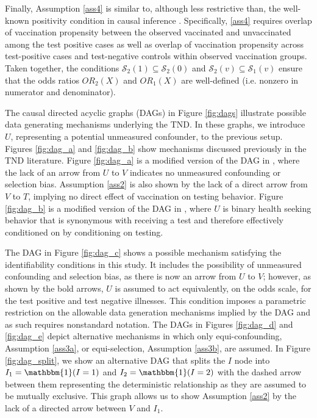 \documentclass[11pt]{article}
\begin{document}
Finally, Assumption \ref{ass4} is similar to, although less restrictive than, the well-known positivity condition in causal inference \cite{hernan_causal_2020}. Specifically, \ref{ass4} requires overlap of vaccination propensity between the observed vaccinated and unvaccinated among the test positive cases as well as overlap of vaccination propensity across test-positive cases and test-negative controls within observed vaccination groups. Taken together, the conditions $\mathcal{S}_2(1) \subseteq \mathcal{S}_2(0)$ and $\mathcal{S}_2(v) \subseteq \mathcal{S}_1(v)$ ensure that the odds ratios $OR_2(X)$ and $OR_1(X)$ are well-defined (i.e. nonzero in numerator and denominator).

The causal directed acyclic graphs (DAGs) in Figure \ref{fig:dags} illustrate possible data generating mechanisms underlying the TND. In these graphs, we introduce $U$, representing a potential unmeasured confounder, to the previous setup. Figures \ref{fig:dag_a} and \ref{fig:dag_b} show mechanisms discussed previously in the TND literature. Figure \ref{fig:dag_a} is a modified version of the DAG in \citeauthor{schnitzer_estimands_2022} \cite{schnitzer_estimands_2022}, where the lack of an arrow from $U$ to $V$ indicates no unmeasured confounding or selection bias. Assumption \ref{ass2} is also shown by the lack of a direct arrow from $V$ to $T$, implying no direct effect of vaccination on testing behavior. Figure \ref{fig:dag_b} is a modified version of the DAG in \citeauthor{sullivan_theoretical_2016} \cite{sullivan_theoretical_2016}, where $U$ is binary health seeking behavior that is synonymous with receiving a test and therefore effectively conditioned on by conditioning on testing.  

The DAG in Figure \ref{fig:dag_c} shows a possible mechanism satisfying the identifiability conditions in this study. It includes the possibility of unmeasured confounding and selection bias, as there is now an arrow from $U$ to $V$; however, as shown by the bold arrows, $U$ is assumed to act equivalently, on the odds scale, for the test positive and test negative illnesses. This condition imposes a parametric restriction on the allowable data generation mechanisms implied by the DAG and as such requires nonstandard notation. The DAGs in Figures \ref{fig:dag_d} and \ref{fig:dag_e} depict alternative mechanisms in which only equi-confounding, Assumption \ref{ass3a}, or equi-selection, Assumption \ref{ass3b}, are assumed. In Figure \ref{fig:dag_split}, we show an alternative DAG that splits the $I$ node into $I_1 = \mathbbm{1}(I = 1)$ and $I_2 = \mathbbm{1}(I = 2)$ with the dashed arrow between them representing the deterministic relationship as they are assumed to be mutually exclusive. This graph allows us to show Assumption \ref{ass2} by the lack of a directed arrow between $V$ and $I_1$. 
\end{document}
